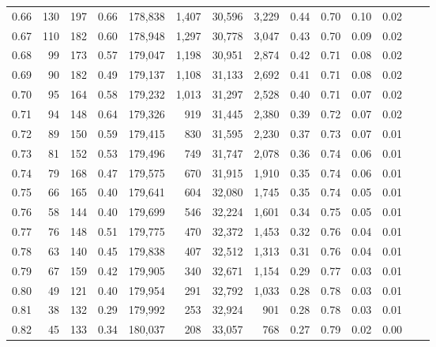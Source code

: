 \begin{tabular}{rrrrrrrrrrrrrr}
0.66 &     130 &  197 &    0.66 &  178,838 &    1,407 &  30,596 &   3,229 &  0.44 &  0.70 &  0.10 &      0.02 \\
0.67 &     110 &  182 &    0.60 &  178,948 &    1,297 &  30,778 &   3,047 &  0.43 &  0.70 &  0.09 &      0.02 \\
0.68 &      99 &  173 &    0.57 &  179,047 &    1,198 &  30,951 &   2,874 &  0.42 &  0.71 &  0.08 &      0.02 \\
0.69 &      90 &  182 &    0.49 &  179,137 &    1,108 &  31,133 &   2,692 &  0.41 &  0.71 &  0.08 &      0.02 \\
0.70 &      95 &  164 &    0.58 &  179,232 &    1,013 &  31,297 &   2,528 &  0.40 &  0.71 &  0.07 &      0.02 \\
0.71 &      94 &  148 &    0.64 &  179,326 &      919 &  31,445 &   2,380 &  0.39 &  0.72 &  0.07 &      0.02 \\
0.72 &      89 &  150 &    0.59 &  179,415 &      830 &  31,595 &   2,230 &  0.37 &  0.73 &  0.07 &      0.01 \\
0.73 &      81 &  152 &    0.53 &  179,496 &      749 &  31,747 &   2,078 &  0.36 &  0.74 &  0.06 &      0.01 \\
0.74 &      79 &  168 &    0.47 &  179,575 &      670 &  31,915 &   1,910 &  0.35 &  0.74 &  0.06 &      0.01 \\
0.75 &      66 &  165 &    0.40 &  179,641 &      604 &  32,080 &   1,745 &  0.35 &  0.74 &  0.05 &      0.01 \\
0.76 &      58 &  144 &    0.40 &  179,699 &      546 &  32,224 &   1,601 &  0.34 &  0.75 &  0.05 &      0.01 \\
0.77 &      76 &  148 &    0.51 &  179,775 &      470 &  32,372 &   1,453 &  0.32 &  0.76 &  0.04 &      0.01 \\
0.78 &      63 &  140 &    0.45 &  179,838 &      407 &  32,512 &   1,313 &  0.31 &  0.76 &  0.04 &      0.01 \\
0.79 &      67 &  159 &    0.42 &  179,905 &      340 &  32,671 &   1,154 &  0.29 &  0.77 &  0.03 &      0.01 \\
0.80 &      49 &  121 &    0.40 &  179,954 &      291 &  32,792 &   1,033 &  0.28 &  0.78 &  0.03 &      0.01 \\
0.81 &      38 &  132 &    0.29 &  179,992 &      253 &  32,924 &     901 &  0.28 &  0.78 &  0.03 &      0.01 \\
0.82 &      45 &  133 &    0.34 &  180,037 &      208 &  33,057 &     768 &  0.27 &  0.79 &  0.02 &      0.00 \\

\end{tabular}

